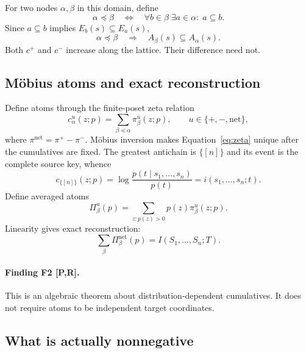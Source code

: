 \documentclass[11pt]{article}
\newcommand{\evidence}[1]{\textbf{[#1]}}
\begin{document}
For two nodes $\alpha,\beta$ in this domain, define
\begin{equation}
\alpha\preceq\beta
\quad\Longleftrightarrow\quad
\forall b\in\beta\;\exists a\in\alpha:\;a\subseteq b.
\label{eq:order}
\end{equation}
Since $a\subseteq b$ implies $E_b(s)\subseteq E_a(s)$,
\begin{equation}
\alpha\preceq\beta\quad\Longrightarrow\quad
A_\beta(s)\subseteq A_\alpha(s).
\label{eq:containment}
\end{equation}
Both $c^+$ and $c^-$ increase along the lattice.  Their difference need not.

\subsection{M\"obius atoms and exact reconstruction}
\label{sec:mobius}

Define atoms through the finite-poset zeta relation
\begin{equation}
c_\alpha^u(z;p)=\sum_{\beta\preceq\alpha}\pi_\beta^u(z;p),
\qquad u\in\{+,-,\mathrm{net}\},
\label{eq:zeta}
\end{equation}
where $\pi^{\mathrm{net}}=\pi^+-\pi^-$.  M\"obius inversion makes
Equation~\eqref{eq:zeta} unique after the cumulatives are fixed.  The greatest
antichain is $\{[n]\}$ and its event is the complete source key, whence
\begin{equation}
c_{\{[n]\}}(z;p)
=\log\frac{p(t\mid s_1,\ldots,s_n)}{p(t)}
=i(s_1,\ldots,s_n;t).
\label{eq:top}
\end{equation}
Define averaged atoms
\begin{equation}
\Pi_\beta^u(p)=\sum_{z:p(z)>0}p(z)\pi_\beta^u(z;p).
\label{eq:average}
\end{equation}
Linearity gives exact reconstruction:
\begin{equation}
\sum_\beta\Pi_\beta^{\mathrm{net}}(p)
=I(S_1,\ldots,S_n;T).
\label{eq:reconstruct}
\end{equation}

\paragraph{Finding F2 \evidence{P,R}.}
This is an algebraic theorem about distribution-dependent cumulatives.  It
does not require atoms to be independent target coordinates.

\subsection{What is actually nonnegative}
\end{document}
